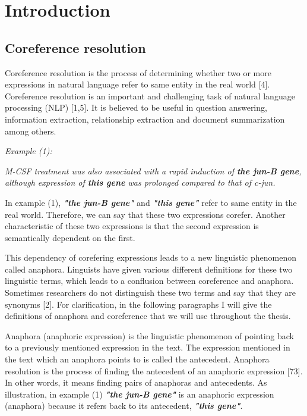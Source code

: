 \chapter{Introduction}
\label{chapter:Introduction}
\section{Coreference resolution}

Coreference resolution is the process of determining whether two or more expressions in natural language refer to same entity in the real world [4]. Coreference resolution is an important and challenging task of natural language processing (NLP) [1,5]. It is believed to be useful in question answering, information extraction, relationship extraction and document summarization among others. \vspace{5mm}
  
\emph{Example (1):}
\begin{changemargin}{10mm}{10mm} 
   \emph{ M-CSF treatment was also associated with a rapid induction of \textbf{the jun-B gene}, although expression of \textbf{this gene} was prolonged compared to that of c-jun.}          
   \vspace{5mm} 
\end{changemargin} 

In example (1), \emph{\textbf{ "the jun-B gene"}} and \emph{ \textbf{"this gene"}} refer to same entity in the real world. Therefore, we can say that these two expressions corefer. Another characteristic of these two expressions is that the second expression is semantically dependent on the first.

This dependency of corefering expressions leads to a new linguistic phenomenon called anaphora. Linguists have given various different definitions for these two linguistic terms, which leads to a conflusion between coreference and anaphora. Sometimes researchers do not distinguish these two terms and say that they are synonyms [2]. For clarification, in the following paragraphs I will give the definitions of anaphora and coreference that we will use throughout the thesis.
  
Anaphora (anaphoric expression) is the linguistic phenomenon of pointing back to a previously mentioned expression in the text. The expression mentioned in the text which an anaphora points to is called the antecedent. Anaphora resolution is the process of finding the antecedent of an anaphoric expression [73]. In other words, it means finding pairs of anaphoras and antecedents. As illustration, in example (1) \emph{\textbf{ "the jun-B gene"}} is an anaphoric expression (anaphora) because it refers back to its antecedent, \emph{ \textbf{"this gene"}}. 

